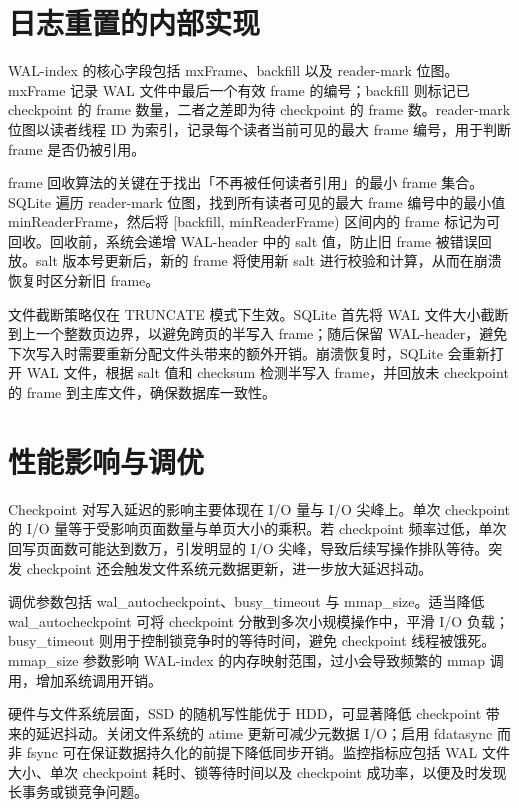 \chapter{日志重置的内部实现}
WAL-index 的核心字段包括 mxFrame、backfill 以及 reader-mark 位图。mxFrame 记录 WAL 文件中最后一个有效 frame 的编号；backfill 则标记已 checkpoint 的 frame 数量，二者之差即为待 checkpoint 的 frame 数。reader-mark 位图以读者线程 ID 为索引，记录每个读者当前可见的最大 frame 编号，用于判断 frame 是否仍被引用。\par
frame 回收算法的关键在于找出「不再被任何读者引用」的最小 frame 集合。SQLite 遍历 reader-mark 位图，找到所有读者可见的最大 frame 编号中的最小值 minReaderFrame，然后将 [backfill, minReaderFrame) 区间内的 frame 标记为可回收。回收前，系统会递增 WAL-header 中的 salt 值，防止旧 frame 被错误回放。salt 版本号更新后，新的 frame 将使用新 salt 进行校验和计算，从而在崩溃恢复时区分新旧 frame。\par
文件截断策略仅在 TRUNCATE 模式下生效。SQLite 首先将 WAL 文件大小截断到上一个整数页边界，以避免跨页的半写入 frame；随后保留 WAL-header，避免下次写入时需要重新分配文件头带来的额外开销。崩溃恢复时，SQLite 会重新打开 WAL 文件，根据 salt 值和 checksum 检测半写入 frame，并回放未 checkpoint 的 frame 到主库文件，确保数据库一致性。\par
\chapter{性能影响与调优}
Checkpoint 对写入延迟的影响主要体现在 I/O 量与 I/O 尖峰上。单次 checkpoint 的 I/O 量等于受影响页面数量与单页大小的乘积。若 checkpoint 频率过低，单次回写页面数可能达到数万，引发明显的 I/O 尖峰，导致后续写操作排队等待。突发 checkpoint 还会触发文件系统元数据更新，进一步放大延迟抖动。\par
调优参数包括 wal\_{}autocheckpoint、busy\_{}timeout 与 mmap\_{}size。适当降低 wal\_{}autocheckpoint 可将 checkpoint 分散到多次小规模操作中，平滑 I/O 负载；busy\_{}timeout 则用于控制锁竞争时的等待时间，避免 checkpoint 线程被饿死。mmap\_{}size 参数影响 WAL-index 的内存映射范围，过小会导致频繁的 mmap 调用，增加系统调用开销。\par
硬件与文件系统层面，SSD 的随机写性能优于 HDD，可显著降低 checkpoint 带来的延迟抖动。关闭文件系统的 atime 更新可减少元数据 I/O；启用 fdatasync 而非 fsync 可在保证数据持久化的前提下降低同步开销。监控指标应包括 WAL 文件大小、单次 checkpoint 耗时、锁等待时间以及 checkpoint 成功率，以便及时发现长事务或锁竞争问题。\par
